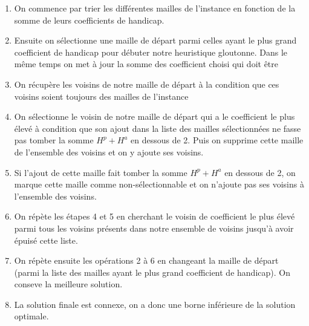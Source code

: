 \documentclass[a4paper,11pt]{article}
\begin{document}
\begin{enumerate}
\item On commence par trier les différentes mailles de l'instance en fonction de la somme de leurs coefficients de handicap.
\item Ensuite on sélectionne une maille de départ parmi celles ayant le plus grand coefficient de handicap pour débuter notre heuristique gloutonne. Dans le même temps on met à jour la somme des coefficient choisi qui doit être 
\item On récupère les voisins de notre maille de départ à la condition que ces voisins soient toujours des mailles de l'instance
\item On sélectionne le voisin de notre maille de départ qui a le coefficient le plus élevé à condition que son ajout dans la liste des mailles sélectionnées ne fasse pas tomber la somme $H^{p}+H^{a}$ en dessous de 2. Puis on supprime cette maille de l'ensemble des voisins et on y ajoute ses voisins.
\item Si l'ajout de cette maille fait tomber la somme $H^{p}+H^{a}$ en dessous de 2, on marque cette maille comme non-sélectionnable et on n'ajoute pas ses voisins à l'ensemble des voisins. 
\item On répète les étapes 4 et 5 en cherchant le voisin de coefficient le plus élevé parmi tous les voisins présents dans notre ensemble de voisins jusqu'à avoir épuisé cette liste.
\item On répète ensuite les opérations 2 à 6 en changeant la maille de départ (parmi la liste des mailles ayant le plus grand coefficient de handicap). On conseve la meilleure solution.
\item La solution finale est connexe, on a donc une borne inférieure de la solution optimale.
\end{enumerate}
\end{document}
